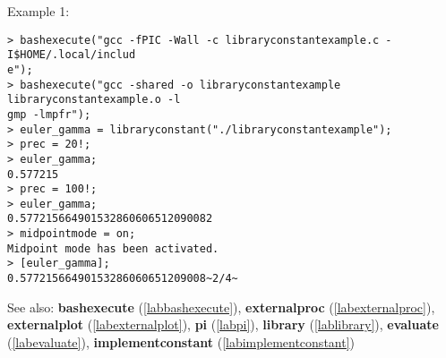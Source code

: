 \noindent Example 1: 
\begin{center}\begin{minipage}{15cm}\begin{Verbatim}[frame=single]
> bashexecute("gcc -fPIC -Wall -c libraryconstantexample.c -I$HOME/.local/includ
e");
> bashexecute("gcc -shared -o libraryconstantexample libraryconstantexample.o -l
gmp -lmpfr");
> euler_gamma = libraryconstant("./libraryconstantexample");
> prec = 20!;
> euler_gamma;
0.577215
> prec = 100!;
> euler_gamma;
0.577215664901532860606512090082
> midpointmode = on;
Midpoint mode has been activated.
> [euler_gamma];
0.57721566490153286060651209008~2/4~
\end{Verbatim}
\end{minipage}\end{center}
See also: \textbf{bashexecute} (\ref{labbashexecute}), \textbf{externalproc} (\ref{labexternalproc}), \textbf{externalplot} (\ref{labexternalplot}), \textbf{pi} (\ref{labpi}), \textbf{library} (\ref{lablibrary}), \textbf{evaluate} (\ref{labevaluate}), \textbf{implementconstant} (\ref{labimplementconstant})
